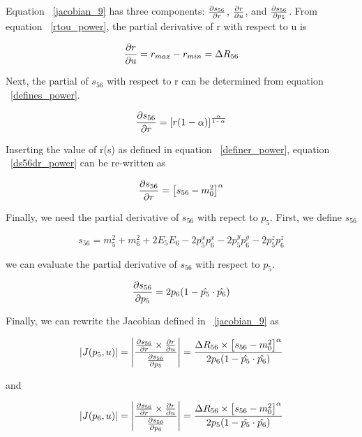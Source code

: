 Equation ~\ref{jacobian_9} has three components: $\frac{\partial s_{56}}{\partial r}$,
$\frac{\partial r}{\partial u}$, and $\frac{\partial s_{56}}{\partial p_{5}}$. From equation ~\ref{rtou_power}, the
partial derivative of r with respect to u is 

\begin{equation}
\label{drdu_power}
\frac{\partial r}{\partial u} = r_{max} - r_{min} = \Delta R_{56}
\end{equation}

Next, the partial of $s_{56}$ with respect to r can be determined from equation ~\ref{defines_power}.

\begin{equation}
\label{ds56dr_power}
\frac{\partial s_{56}}{\partial r} = \left[ r(1-\alpha) \right]^{\frac{\alpha}{1-\alpha}}
\end{equation}

Inserting the value of r(s) as defined in equation ~\ref{definer_power}, equation ~\ref{ds56dr_power} can be re-written as

\begin{equation}
\label{ds56dr_power2}
\frac{\partial s_{56}}{\partial r} = \left[ s_{56} - m_{0}^{2} \right]^{\alpha}
\end{equation}

Finally, we need the partial derivative of $s_{56}$ with repect to $p_{5}$. First, we define $s_{56}$

\begin{equation}
\label{defines56_power}
s_{56} = m_{5}^{2} + m_{6}^{2} + 2E_{5}E_{6} - 2p_{5}^{x}p_{6}^{x} - 2p_{5}^{y}p_{6}^{y} - 2p_{5}^{z}p_{6}^{z}
\end{equation}

we can evaluate the partial derivative of $s_{56}$ with respect to $p_{5}$.

\begin{equation}
\label{ds56dp5_power}
\frac{\partial s_{56}}{\partial p_{5}} = 2p_{6}(1 - \hat{p_{5}} \cdot \hat{p_{6}})
\end{equation}

Finally, we can rewrite the Jacobian defined in ~\ref{jacobian_9} as

\begin{equation}
\label{jacobian_10}
|J(p_{5}, u)| = \left | \frac{\frac{\partial s_{56}}{\partial r} \times
\frac{\partial r}{\partial u}}{\frac{\partial s_{56}}{\partial p_{5}}} \right | = \frac{\Delta R_{56} \times \left[ s_{56}-m_{0}^{2} \right]^{\alpha}}{2p_{6}(1 - \hat{p_{5}} \cdot \hat{p_{6}})}
\end{equation}

and 

\begin{equation}
\label{jacobian_11}
|J(p_{6}, u)| = \left | \frac{\frac{\partial s_{56}}{\partial r} \times
\frac{\partial r}{\partial u}}{\frac{\partial s_{56}}{\partial p_{6}}} \right | = \frac{\Delta R_{56} \times \left[ s_{56}-m_{0}^{2} \right]^{\alpha}}{2p_{5}(1 - \hat{p_{5}} \cdot \hat{p_{6}})}
\end{equation}
